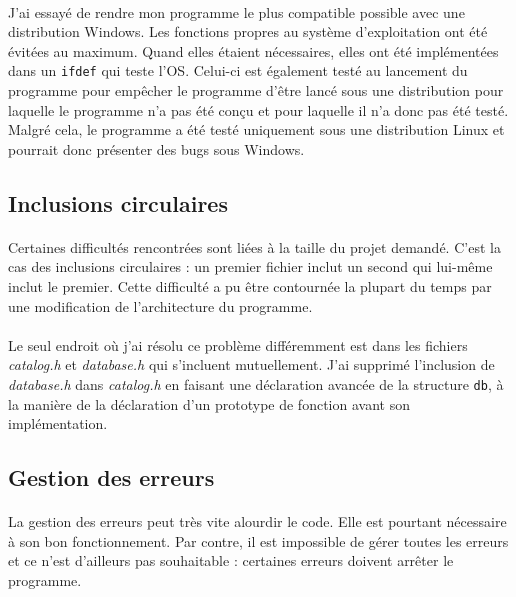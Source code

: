 \documentclass{article}
\begin{document}
    \paragraph{}
    J'ai essayé de rendre mon programme le plus compatible possible avec une distribution Windows. Les fonctions propres au système d'exploitation ont été évitées au maximum. Quand elles étaient nécessaires, elles ont été implémentées dans un \texttt{ifdef} qui teste l'OS. Celui-ci est également testé au lancement du programme pour empêcher le programme d'être lancé sous une distribution pour laquelle le programme n'a pas été conçu et pour laquelle il n'a donc pas été testé. Malgré cela, le programme a été testé uniquement sous une distribution Linux et pourrait donc présenter des bugs sous Windows.


    \subsection{Inclusions circulaires}
    \paragraph{}
    Certaines difficultés rencontrées sont liées à la taille du projet demandé. C'est la cas des inclusions circulaires : un premier fichier inclut un second qui lui-même inclut le premier. Cette difficulté a pu être contournée la plupart du temps par une modification de l'architecture du programme.

    \paragraph{}
    Le seul endroit où j'ai résolu ce problème différemment est dans les fichiers \emph{catalog.h} et \emph{database.h} qui s'incluent mutuellement. J'ai supprimé l'inclusion de \emph{database.h} dans \emph{catalog.h} en faisant une déclaration avancée de la structure \texttt{db}, à la manière de la déclaration d'un prototype de fonction avant son implémentation.


    \subsection{Gestion des erreurs}
    \paragraph{}
    La gestion des erreurs peut très vite alourdir le code. Elle est pourtant nécessaire à son bon fonctionnement. Par contre, il est impossible de gérer toutes les erreurs et ce n'est d'ailleurs pas souhaitable : certaines erreurs doivent arrêter le programme.
\end{document}

